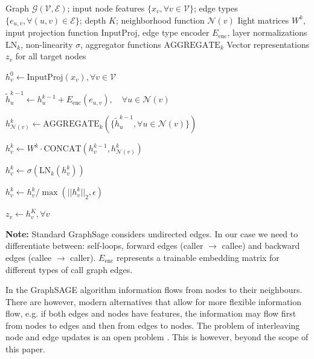 \documentclass{article}
\theoremstyle{plain}
\theoremstyle{definition}
\theoremstyle{remark}
\begin{document}
\begin{algorithm}[tb]
   \caption{GraphSAGE}
   \label{alg:graphsage}
\begin{algorithmic}
    Graph $\mathcal{G}(\mathcal{V}, \mathcal{E})$; input node features $\{x_v, \forall v \in \mathcal{V}\}$; edge types $\{e_{u,v}, \forall (u,v) \in \mathcal{E}\}$; depth $K$; neighborhood function $\mathcal{N}(v)$
    Iight matrices $W^k$, input projection function $\text{InputProj}$, edge type encoder $E_{\text{enc}}$, layer normalizations $\text{LN}_k$, non-linearity $\sigma$, aggregator functions $\text{AGGREGATE}_k$
    Vector representations $z_v$ for all target nodes
   
   \STATE $h^0_v \leftarrow \text{InputProj}(x_v), \forall v \in \mathcal{V}$
   
           \STATE $\tilde{h}^{k-1}_u \leftarrow h^{k-1}_u + E_{\text{enc}}(e_{u,v}), \quad \forall u \in \mathcal{N}(v)$
           
           \STATE $h^k_{\mathcal{N}(v)} \leftarrow \text{AGGREGATE}_k(\{\tilde{h}^{k-1}_u, \forall u \in \mathcal{N}(v)\})$
           
           \STATE $h^k_v \leftarrow W^k \cdot \text{CONCAT}(h^{k-1}_v, h^k_{\mathcal{N}(v)})$
           
               \STATE $h^k_v \leftarrow \sigma\left(\text{LN}_k(h^k_v)\right)$
           \ENDIF
           
           \STATE $h^k_v \leftarrow h^k_v / \max(||h^k_v||_2, \epsilon)$
       \ENDFOR
   \ENDFOR
   
   \STATE $z_v \leftarrow h^K_v, \forall v$
\end{algorithmic}

\vspace{0.1in}
\footnotesize{\textbf{Note:} Standard GraphSage considers undirected edges. In our case we need to differentiate between: self-loops, forward edges (caller $\rightarrow$ callee) and backward edges (callee $\rightarrow$ caller). $E_{\text{enc}}$ represents a trainable embedding matrix for different types of call graph edges.}

\end{algorithm}

In the GraphSAGE algorithm information flows from nodes to their neighbours. There are however, modern alternatives that allow for more flexible information flow, e.g. if both edges and nodes have features, the information may flow first from nodes to edges and then from edges to nodes. The problem of interleaving node and edge updates is an open problem \cite{gn}. This is however, beyond the scope of this paper.
\end{document}
